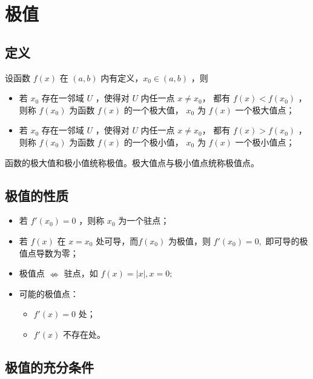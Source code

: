\section{极值}

\subsection{定义}

\begin{Def}[极值]

    设函数 $ f(x) $ 在 $ (a,b) $ 内有定义，$ x_0\in (a,b) $ ，则
    \begin{itemize}
        \item 若 $ x_0 $ 存在一邻域 $ U $ ，使得对 $ U $ 内任一点 $ x \neq x_0 $，
        都有 $ f(x)<f(x_0) $ ，则称 $ f(x_0) $ 为函数 $ f(x) $ 的一个极大值，
        $ x_0 $ 为 $ f(x) $ 一个极大值点；
        \item 若 $ x_0 $ 存在一邻域 $ U $ ，使得对 $ U $ 内任一点 $ x \neq x_0 $，
        都有 $ f(x)>f(x_0) $ ，则称 $ f(x_0) $ 为函数 $ f(x) $ 的一个极小值，
        $ x_0 $ 为 $ f(x) $ 一个极小值点；
    \end{itemize}
    函数的极大值和极小值统称极值。极大值点与极小值点统称极值点。
\end{Def}

\subsection{极值的性质}

\begin{itemize}
    \item 若 $ f'(x_0)=0 $ ，则称 $ x_0 $ 为一个驻点；
    \item 若 $ f(x) $ 在 $ x=x_0 $ 处可导，而$ f(x_0) $ 为极值，则 $ f'(x_0)=0, $
    即可导的极值点导数为零；
    \item 极值点 $ \nLeftrightarrow $ 驻点，如 $ f(x)=|x|, x=0; $ 
    \item 可能的极值点：\begin{itemize}
        \item $ f'(x)=0 $ 处；
        \item $ f'(x) $ 不存在处。
    \end{itemize}
\end{itemize}

\subsection{极值的充分条件}

